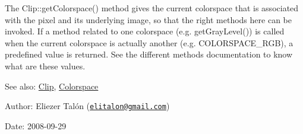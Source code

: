 The Clip::getColorspace() method gives the current colorspace that is associated with the pixel and its underlying image, so that the right methods here can be invoked. If a method related to one colorspace (e.g. getGrayLevel()) is called when the current colorspace is actually another (e.g. COLORSPACE\_\-RGB), a predefined value is returned. See the different methods documentation to know what are these values.

\begin{Desc}
\item[See also:]\hyperlink{class_clip}{Clip}, \hyperlink{_colorspace_8h_7a7e24cdb2a27271343f0adceff89f65}{Colorspace}\end{Desc}
\begin{Desc}
\item[Author:]Eliezer Talón (\href{mailto:elitalon@gmail.com}{\tt elitalon@gmail.com}) \end{Desc}
\begin{Desc}
\item[Date:]2008-09-29 \end{Desc}


